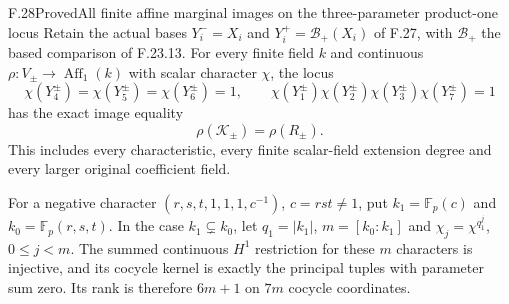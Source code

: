 \begin{claim}{F.28}{Proved}{All finite affine marginal images on the three-parameter product-one locus}
Retain the actual bases $Y_i^-=X_i$ and
$Y_i^+=\mathcal B_+(X_i)$ of F.27, with
$\mathcal B_+$ the based comparison of F.23.13.
For every finite field $k$ and continuous
$\rho:V_\pm\to\operatorname{Aff}_1(k)$ with scalar
character $\chi$, the locus
\[
 \chi(Y_4^\pm)=\chi(Y_5^\pm)=\chi(Y_6^\pm)=1,
 \qquad
 \chi(Y_1^\pm)\chi(Y_2^\pm)\chi(Y_3^\pm)
                         \chi(Y_7^\pm)=1
                                                               \tag{F.28.1}
\]
has the exact image equality
\[
                         \rho(\mathcal K_\pm)=\rho(R_\pm).
                                                               \tag{F.28.2}
\]
This includes every characteristic, every finite
scalar-field extension degree and every larger
original coefficient field.

For a negative character
$(r,s,t,1,1,1,c^{-1})$, $c=rst\ne1$, put
$k_1=\mathbb F_p(c)$ and $k_0=\mathbb F_p(r,s,t)$.
In the case $k_1\subsetneq k_0$, let
$q_1=|k_1|$, $m=[k_0:k_1]$ and
$\chi_j=\chi^{q_1^j}$, $0\leq j<m$.
The summed continuous $H^1$ restriction for these
$m$ characters is injective, and its cocycle
kernel is exactly the principal tuples with
parameter sum zero. Its rank is therefore
$6m+1$ on $7m$ cocycle coordinates.
\end{claim}

